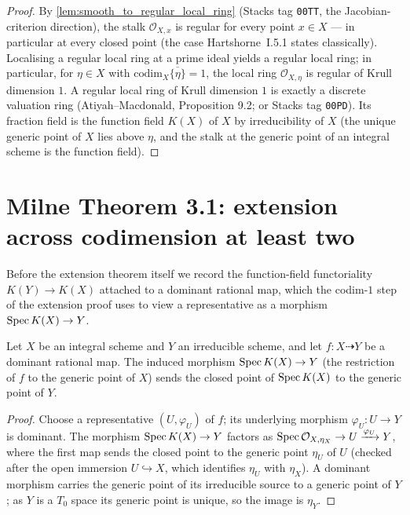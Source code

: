 \begin{proof}

  By \cref{lem:smooth_to_regular_local_ring} (Stacks tag \texttt{00TT}, the
  Jacobian-criterion direction), the stalk \(\mathcal O_{X, x}\) is regular for
  every point \(x \in X\) --- in particular at every closed point (the case
  Hartshorne~I.5.1 states classically). Localising a regular local ring at a
  prime ideal yields a regular local ring; in particular, for \(\eta \in X\) with
  \(\mathrm{codim}_X \overline{\{\eta\}} = 1\), the local ring
  \(\mathcal O_{X, \eta}\) is regular of Krull dimension \(1\). A regular local ring of Krull dimension \(1\) is exactly a
  discrete valuation ring (Atiyah--Macdonald, Proposition 9.2; or Stacks tag
  \texttt{00PD}). Its fraction field is the function field \(K(X)\) of \(X\) by
  irreducibility of \(X\) (the unique generic point of \(X\) lies above \(\eta\), and the
  stalk at the generic point of an integral scheme is the function field).
\end{proof}

\section{Milne Theorem 3.1: extension across codimension at least two}
\label{sec:milne_thm31}

Before the extension theorem itself we record the function-field functoriality
\(K(Y) \to K(X)\) attached to a dominant rational map, which the codim-\(1\) step of
the extension proof uses to view a representative as a morphism \(\operatorname{Spec} K(X) \to Y\).

\begin{lemma}\leanok
  \label{lem:fromFunctionField_base_eq_genericPoint}
  Let \(X\) be an integral scheme and \(Y\) an irreducible scheme, and let
  \(f \colon X \dashrightarrow Y\) be a dominant rational map. The induced morphism
  \(\operatorname{Spec} K(X) \to Y\) (the restriction of \(f\) to the generic point of \(X\))
  sends the closed point of \(\operatorname{Spec} K(X)\) to the generic point of \(Y\).
\end{lemma}

\begin{proof}\leanok
  Choose a representative \((U, \varphi_U)\) of \(f\); its underlying morphism
  \(\varphi_U \colon U \to Y\) is dominant. The morphism \(\operatorname{Spec} K(X) \to Y\) factors as
  \(\operatorname{Spec} \mathcal O_{X,\eta_X} \to U \xrightarrow{\varphi_U} Y\), where the first map
  sends the closed point to the generic point \(\eta_U\) of \(U\) (checked after the open
  immersion \(U \hookrightarrow X\), which identifies \(\eta_U\) with \(\eta_X\)). A
  dominant morphism carries the generic point of its irreducible source to a generic
  point of \(Y\); as \(Y\) is a \(T_0\) space its generic point is unique, so the image
  is \(\eta_Y\).
\end{proof}

